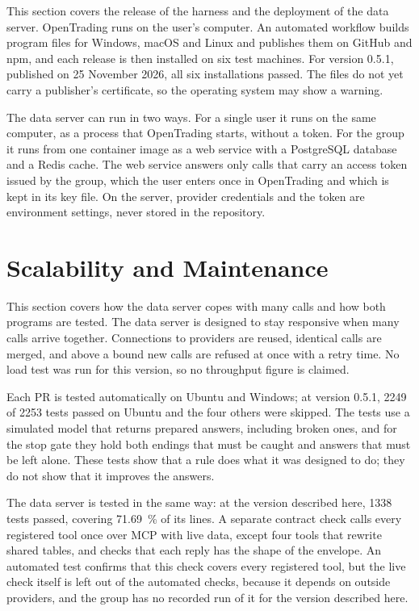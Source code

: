 This section covers the release of the harness and the deployment of the data server.
\label{sec:release}
OpenTrading runs on the user's computer.
An automated workflow builds program files for Windows, macOS and Linux and publishes them on GitHub and npm, and each release is then installed on six test machines.
For version 0.5.1, published on 25 November 2026, all six installations passed.
The files do not yet carry a publisher's certificate, so the operating system may show a warning.

\label{sec:mcp-deployment}
The data server can run in two ways.
For a single user it runs on the same computer, as a process that OpenTrading starts, without a token.
For the group it runs from one container image as a web service with a PostgreSQL database and a Redis cache.
The web service answers only calls that carry an access token issued by the group, which the user enters once in OpenTrading and which is kept in its key file.
On the server, provider credentials and the token are environment settings, never stored in the repository.

\section{Scalability and Maintenance}\label{sec:scalability}

This section covers how the data server copes with many calls and how both programs are tested.
\label{sec:scaling}
The data server is designed to stay responsive when many calls arrive together.
Connections to providers are reused, identical calls are merged, and above a bound new calls are refused at once with a retry time.
No load test was run for this version, so no throughput figure is claimed.

\label{sec:testing}
Each PR is tested automatically on Ubuntu and Windows; at version 0.5.1, \num{2249} of \num{2253} tests passed on Ubuntu and the four others were skipped.
The tests use a simulated model that returns prepared answers, including broken ones, and for the stop gate they hold both endings that must be caught and answers that must be left alone.
These tests show that a rule does what it was designed to do; they do not show that it improves the answers.

The data server is tested in the same way: at the version described here, \num{1338} tests passed, covering \qty{71.69}{\percent} of its lines.
A separate contract check calls every registered tool once over MCP with live data, except four tools that rewrite shared tables, and checks that each reply has the shape of the envelope.
An automated test confirms that this check covers every registered tool, but the live check itself is left out of the automated checks, because it depends on outside providers, and the group has no recorded run of it for the version described here.
